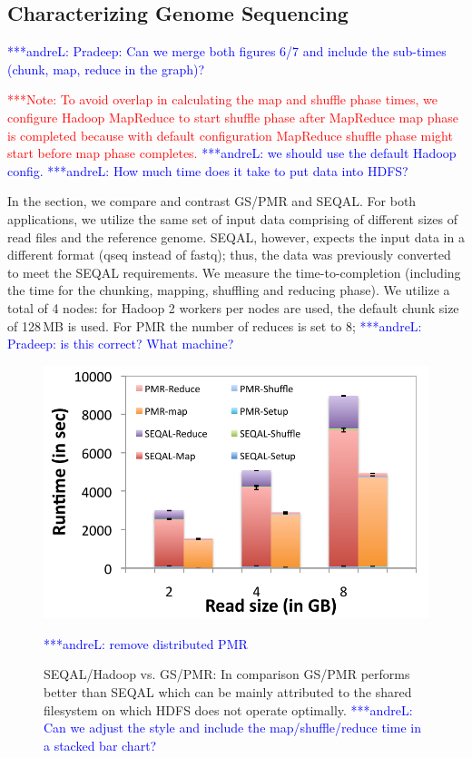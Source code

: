 \documentclass{acm_proc_article-sp}
\newcommand{\alnote}[1]{ {\textcolor{blue} { ***andreL: #1 }}}
\newcommand{\note}[1]{ {\textcolor{red} { ***Note: #1 }}}
\newcommand{\alnote}[1]{}
\newcommand{\note}[1]{}
\begin{document}


\subsection{Characterizing Genome Sequencing}

\alnote{Pradeep: Can we merge both figures 6/7 and include the sub-times 
(chunk, map, reduce in the graph)?}

\note{To avoid overlap in calculating the map and shuffle phase times, we
configure Hadoop MapReduce to start shuffle phase after MapReduce map phase is
completed because with default configuration MapReduce shuffle phase might
start before map phase completes.}\alnote{we should use the default Hadoop 
config.}
\alnote{How much time does it take to put data into HDFS?}

In the section, we compare and contrast GS/PMR and SEQAL. For both
applications, we utilize the same set of input data comprising of different
sizes of read files and the reference genome. SEQAL, however, expects the 
input data in a different format (qseq instead of fastq); thus, the data was 
previously converted to meet the SEQAL requirements. We measure the
time-to-completion (including the time for the chunking, mapping, shuffling
and reducing phase). We utilize a total of 4 nodes: for Hadoop 2 workers per 
nodes are used, the default chunk size of 128\,MB is used. For PMR the number 
of reduces is set to 8; \alnote{Pradeep: is this correct? What machine?} 

\begin{figure}
 \centering
\includegraphics[scale=0.50]{figures/seqalvspmr.pdf}
\caption{SEQAL/Hadoop  vs. GS/PMR:  In comparison GS/PMR performs better than 
SEQAL which can be mainly attributed to the shared filesystem on which HDFS 
does not operate optimally.
\alnote{Can we adjust the style and include the map/shuffle/reduce time in a 
stacked bar chart?}}
\alnote{remove distributed PMR}
\label{fig:comp_with_seqal_1} 
\end{figure}
\end{document}
